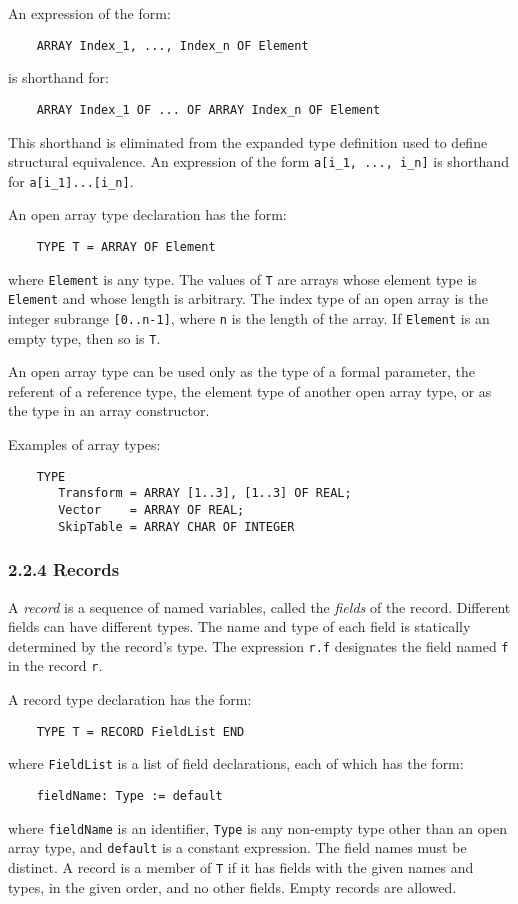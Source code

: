 \documentclass[10pt]{article}
\begin{document}
An expression of the form:
\begin{verbatim}
    ARRAY Index_1, ..., Index_n OF Element
\end{verbatim}
is shorthand for:
\begin{verbatim}
    ARRAY Index_1 OF ... OF ARRAY Index_n OF Element
\end{verbatim}
This shorthand is eliminated from the expanded type definition used to define
structural equivalence.  An expression of the form \verb|a[i_1, ..., i_n]| is
shorthand for \verb|a[i_1]...[i_n]|.

An open array type declaration has the form:
\begin{verbatim}
    TYPE T = ARRAY OF Element
\end{verbatim}
where \verb|Element| is any type.  The values of \verb|T| are arrays whose
element type is \verb|Element| and whose length is arbitrary.  The index type
of an open array is the integer subrange \verb|[0..n-1]|, where \verb|n| is
the length of the array.   If \verb|Element| is an empty type, then so 
is \verb|T|.

An open array type can be used only as the type of a formal parameter, the
referent of a reference type, the element type of another open array type, or
as the type in an array constructor.

Examples of array types:
\begin{verbatim}
    TYPE
       Transform = ARRAY [1..3], [1..3] OF REAL;
       Vector    = ARRAY OF REAL;
       SkipTable = ARRAY CHAR OF INTEGER
\end{verbatim}

\subsubsection*{2.2.4 Records}

A \emph{record} is a sequence of named variables, called the \emph{fields} of
the record.  Different fields can have different types.  The name and type of
each field is statically determined by the record's type.  The expression
\verb|r.f| designates the field named \verb|f| in the record \verb|r|.

A record type declaration has the form:
\begin{verbatim}
    TYPE T = RECORD FieldList END
\end{verbatim}
where \verb|FieldList| is a list of field declarations, each of which has the
form:
\begin{verbatim}
    fieldName: Type := default
\end{verbatim}
where \verb|fieldName| is an identifier, \verb|Type| is any non-empty type
other than an open array type, and \verb|default| is a constant expression.
The field names must be distinct.  A record is a member of \verb|T| if it has
fields with the given names and types, in the given order, and no other
fields.  Empty records are allowed.
\end{document}
